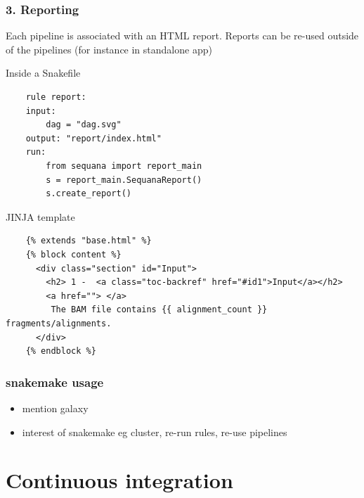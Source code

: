 \documentclass{beamer}
\begin{document}
\begin{frame}[fragile]
    \frametitle{3. Reporting}
    Each pipeline is associated with an HTML report. Reports can be re-used 
    outside of the pipelines (for instance in standalone app)
    \begin{block}{Inside a Snakefile}
    \begin{lstlisting}
    rule report:
    input:
        dag = "dag.svg"
    output: "report/index.html"
    run:
        from sequana import report_main
        s = report_main.SequanaReport()
        s.create_report()
    \end{lstlisting}
    \end{block}
    
    \begin{block}{JINJA template}
    \begin{lstlisting}
    {% extends "base.html" %}
    {% block content %}
      <div class="section" id="Input">
        <h2> 1 -  <a class="toc-backref" href="#id1">Input</a></h2>
        <a href=""> </a>
         The BAM file contains {{ alignment_count }} fragments/alignments.
      </div>
    {% endblock %}
  \end{lstlisting}
   \end{block}

 
\end{frame}





\begin{frame}
 \frametitle{snakemake usage }
 \tiny
 \begin{block}{}
  \begin{itemize}
   \item mention galaxy
   \item interest of snakemake eg cluster, re-run rules, re-use pipelines
   \end{itemize}
 \end{block} 
\end{frame}




\section{Continuous integration}
\end{document}
